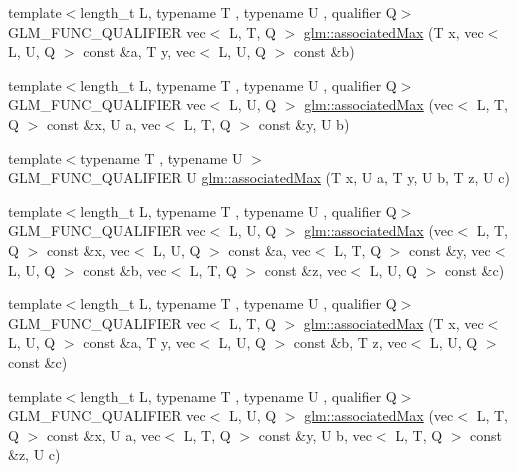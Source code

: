 \begin{DoxyCompactItemize}
\item 
{\footnotesize template$<$length\+\_\+t L, typename T , typename U , qualifier Q$>$ }\\G\+L\+M\+\_\+\+F\+U\+N\+C\+\_\+\+Q\+U\+A\+L\+I\+F\+I\+ER vec$<$ L, T, Q $>$ \hyperlink{group__gtx__associated__min__max_ga0d169d6ce26b03248df175f39005d77f}{glm\+::associated\+Max} (T x, vec$<$ L, U, Q $>$ const \&a, T y, vec$<$ L, U, Q $>$ const \&b)
\item 
{\footnotesize template$<$length\+\_\+t L, typename T , typename U , qualifier Q$>$ }\\G\+L\+M\+\_\+\+F\+U\+N\+C\+\_\+\+Q\+U\+A\+L\+I\+F\+I\+ER vec$<$ L, U, Q $>$ \hyperlink{group__gtx__associated__min__max_ga4086269afabcb81dd7ded33cb3448653}{glm\+::associated\+Max} (vec$<$ L, T, Q $>$ const \&x, U a, vec$<$ L, T, Q $>$ const \&y, U b)
\item 
{\footnotesize template$<$typename T , typename U $>$ }\\G\+L\+M\+\_\+\+F\+U\+N\+C\+\_\+\+Q\+U\+A\+L\+I\+F\+I\+ER U \hyperlink{group__gtx__associated__min__max_gaec891e363d91abbf3a4443cf2f652209}{glm\+::associated\+Max} (T x, U a, T y, U b, T z, U c)
\item 
{\footnotesize template$<$length\+\_\+t L, typename T , typename U , qualifier Q$>$ }\\G\+L\+M\+\_\+\+F\+U\+N\+C\+\_\+\+Q\+U\+A\+L\+I\+F\+I\+ER vec$<$ L, U, Q $>$ \hyperlink{group__gtx__associated__min__max_gab84fdc35016a31e8cd0cbb8296bddf7c}{glm\+::associated\+Max} (vec$<$ L, T, Q $>$ const \&x, vec$<$ L, U, Q $>$ const \&a, vec$<$ L, T, Q $>$ const \&y, vec$<$ L, U, Q $>$ const \&b, vec$<$ L, T, Q $>$ const \&z, vec$<$ L, U, Q $>$ const \&c)
\item 
{\footnotesize template$<$length\+\_\+t L, typename T , typename U , qualifier Q$>$ }\\G\+L\+M\+\_\+\+F\+U\+N\+C\+\_\+\+Q\+U\+A\+L\+I\+F\+I\+ER vec$<$ L, T, Q $>$ \hyperlink{group__gtx__associated__min__max_gadd2a2002f4f2144bbc39eb2336dd2fba}{glm\+::associated\+Max} (T x, vec$<$ L, U, Q $>$ const \&a, T y, vec$<$ L, U, Q $>$ const \&b, T z, vec$<$ L, U, Q $>$ const \&c)
\item 
{\footnotesize template$<$length\+\_\+t L, typename T , typename U , qualifier Q$>$ }\\G\+L\+M\+\_\+\+F\+U\+N\+C\+\_\+\+Q\+U\+A\+L\+I\+F\+I\+ER vec$<$ L, U, Q $>$ \hyperlink{group__gtx__associated__min__max_ga19f59d1141a51a3b2108a9807af78f7f}{glm\+::associated\+Max} (vec$<$ L, T, Q $>$ const \&x, U a, vec$<$ L, T, Q $>$ const \&y, U b, vec$<$ L, T, Q $>$ const \&z, U c)

\end{DoxyCompactItemize}
